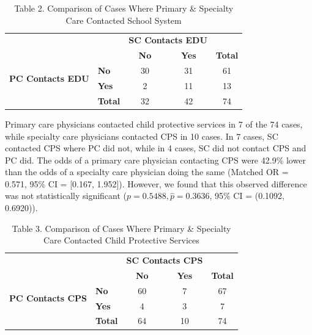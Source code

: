 \documentclass{article}
\begin{document}
	\newpage
	\begin{table}[h]
		\centering
		\footnotesize
		\captionsetup{labelformat=empty}
		\caption{Table 2. Comparison of Cases Where Primary \& Specialty Care Contacted School System}
		\renewcommand{\arraystretch}{1.2}
		\begin{tabular}{llccc}
			\toprule
			& & \multicolumn{2}{c}{\textbf{SC Contacts EDU}} & \\  
			\cmidrule(lr){3-4}
			& & \textbf{No} & \textbf{Yes} & \textbf{Total} \\  
			\midrule
			\multirow{2}{*}{\textbf{PC Contacts EDU}} & \textbf{No} & 30 & 31 & 61 \\  
			& \textbf{Yes} & 2 & 11 & 13 \\  
			\midrule
			& \textbf{Total} & 32 & 42 & 74 \\  
			\bottomrule
		\end{tabular}
		\label{tab:pc_sc_edu}
	\end{table}

	Primary care physicians contacted child protective services in 7 of the 74 cases, while specialty care physicians contacted CPS in 10 cases. In 7 cases, SC contacted CPS where PC did not, while in 4 cases, SC did not contact CPS and PC did. The odds of a primary care physician contacting CPS were 42.9\% lower than the odds of a specialty care physician doing the same (Matched OR = 0.571,  95\% CI = [0.167, 1.952]). However, we found that this observed difference was not statistically significant ($p = 0.5488, \hat{p} = 0.3636$, 95\% CI = (0.1092, 0.6920)).

	\begin{table}[h]
		\centering
		\footnotesize
		\captionsetup{labelformat=empty}
		\caption{Table 3. Comparison of Cases Where Primary \& Specialty Care Contacted Child Protective Services}
		\renewcommand{\arraystretch}{1.2}
		\begin{tabular}{llccc}
			\toprule
			& & \multicolumn{2}{c}{\textbf{SC Contacts CPS}} & \\  
			\cmidrule(lr){3-4}
			& & \textbf{No} & \textbf{Yes} & \textbf{Total} \\  
			\midrule
			\multirow{2}{*}{\textbf{PC Contacts CPS}} & \textbf{No} & 60 & 7 & 67 \\  
			& \textbf{Yes} & 4 & 3 & 7 \\  
			\midrule
			& \textbf{Total} & 64 & 10 & 74 \\  
			\bottomrule
		\end{tabular}
		\label{tab:pc_sc_cps}
	\end{table}
\end{document}
